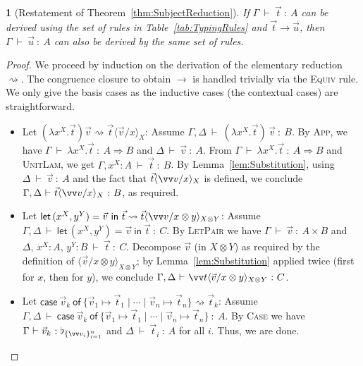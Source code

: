 \documentclass[a4paper,UKenglish,numberwithinsect,pdfa,anonymous]{lipics-v2021}
\theoremstyle{restatestyle}
\newtheorem*{restatetheorem}{}
\newcommand\lra{\longrightarrow}
\newcommand\ansubst[2]{\ensuremath{\langle #1 \rangle_{#2}}}
\def\Pair#1#2{(#1,#2)} %
\def\Lam#1#2#3{\lambda#1^{#2}{.}#3} %
\def\letkeyword{\mathsf{let}}
\def\inkeyword{\mathsf{in}}
\def\LetP#1#2#3#4#5#6{\letkeyword\,\Pair{#1^{#2}}{#3^{#4}}=#5~\inkeyword~#6}
\def\gencase#1#2#3#4#5{\ensuremath{\mathsf{case}~#1~\mathsf{of}~\{#2\mapsto #4 \mid \dotsb \mid #3\mapsto #5\}}}
\def\lraneq{\rightsquigarrow}
\def\Arr{\Rightarrow}
\def\TYP#1#2#3{#1~{\vdash}~#2~{:}~#3}
\newcommand\basis[1]{\ensuremath{\flat_{#1}}}
\begin{document}
\begin{restatetheorem}[Restatement of Theorem~\ref{thm:SubjectReduction}]
  If $\TYP{\Gamma}{\vec{t}}{A}$ can be derived using the set of rules in
  Table~\ref{tab:TypingRules} and $\vec{t}\to\vec{u}$, then
  $\TYP{\Gamma}{\vec{u}}{A}$ can also be derived by the same set of rules.
\end{restatetheorem}
\begin{proof}
  We proceed by induction on the derivation of the elementary reduction
  $\lraneq$. The congruence closure to obtain $\lra$ is handled trivially via
  the \textsc{Equiv} rule. We only give the basis cases as the inductive cases (the contextual cases) are straightforward.
  \begin{itemize}
    \item Let $(\Lam{x}{X}{\vec t})\vec v \lraneq \vec t\ansubst{\vec v/x}{X}$:
      Assume $\TYP{\Gamma,\Delta}{(\Lam{x}{X}{\vec t})\,\vec v}{B}$. By
      \textsc{App}, we have $\TYP{\Gamma}{\Lam{x}{X}{\vec t}}{A\Arr B}$ and
      $\TYP{\Delta}{\vec v}{A}$.  From $\TYP{\Gamma}{\Lam{x}{X}{\vec t}}{A\Arr B}$
      and \textsc{UnitLam}, we get $\TYP{\Gamma,x^{X}:A}{\vec t}{B}$. By
      Lemma~\ref{lem:Substitution},
      using $\TYP{\Delta}{\vec v}{A}$ and the fact that $\vec t\ansubst{\vv
      v/x}{X}$ is defined, we conclude $\TYP{\Gamma,\Delta}{\vec t\ansubst{\vv
      v/x}{X}}{B}$, as required.

    \item Let $\LetP{x}{X}{y}{Y}{\vec v}{\vec t} \lraneq \vec t\ansubst{\vv
      v/x\otimes y}{X\otimes Y}$: Assume
      $\TYP{\Gamma,\Delta}{\LetP{x}{X}{y}{Y}{\vec v}{\vec t}}{C}$.  By
      \textsc{LetPair} we have $\TYP{\Gamma}{\vec v}{A\times B}$ and
      $\TYP{\Delta,\,x^{X}:A,\,y^{Y}:B}{\vec t}{C}$.  Decompose $\vec v$ (in
      $X\otimes Y$) as required by the definition of $\ansubst{\vec v/x\otimes
      y}{X\otimes Y}$; by Lemma~\ref{lem:Substitution}
      applied twice
      (first for $x$, then for $y$), we conclude $\TYP{\Gamma,\Delta}{\vv
      t\ansubst{\vec v/x\otimes y}{X\otimes Y}}{C}$.

    \item Let $\gencase{\vec{v}_{k}}{\vec{v}_{1}}{\vec{v}_{n}}{\vec{t}_{1}}{\vec{t}_{n}}
      \lraneq \vec{t}_{k}$: Assume
      $\TYP{\Gamma,\Delta}{\gencase{\vec{v}_{k}}{\vec{v}_{1}}{\vec{v}_{n}}{\vec{t}_{1}}{\vec{t}_{n}}}{A}$.
      By \textsc{Case} we have $\TYP{\Gamma}{{\vec{v}_{k}}}{\basis{\{\vv
      v_i\}_{i=1}^n}}$ and $\TYP{\Delta}{\vec t_i}{A}$ for all $i$.  Thus, we are
      done.


\end{itemize}
\end{proof}
\end{document}
